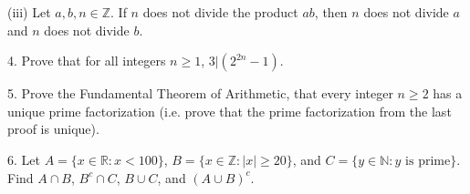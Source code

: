 \documentclass{article}
\theoremstyle{remark} %
\newcommand{\R}{{\mathbb{R}}}
\newcommand{\Z}{{\mathbb{Z}}}
\newcommand{\N}{{\mathbb{N}}}
\begin{document}
\vspace{7cm} %




(iii) Let $a,b,n \in \Z$. If $n$ does not divide the product $ab$, then $n$ does not divide $a$ and $n$ does not divide $b$.

\vspace{7cm} %




4. Prove that for all integers $n \geq 1$, $3|(2^{2n}-1)$.

\vspace{12cm} %




5. Prove the Fundamental Theorem of Arithmetic, that every integer $n \geq 2$ has a unique prime factorization (i.e. prove that the prime factorization from the last proof is unique).

\vspace{11cm} %




6. Let $A = \{x\in \R : x <100\}$, $B = \{x\in \Z : |x| \geq 20\}$, and $C = \{y \in \N : y \text{ is prime}\}$. Find $A \cap B$, $B^c \cap C$, $B \cup C$, and $(A \cup B )^c$.


\vspace{11cm} %

\end{document}
